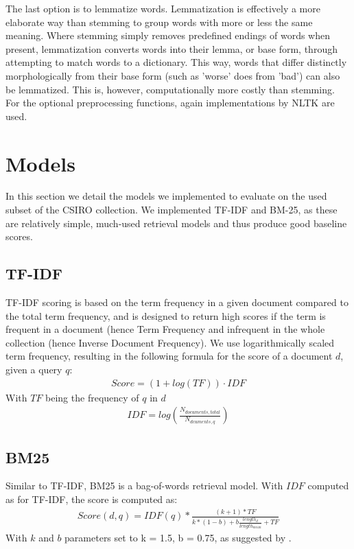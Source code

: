 \documentclass{article}
\begin{document}
The last option is to lemmatize words. Lemmatization is effectively a more elaborate way than stemming to group words with more or less the same meaning. Where stemming simply removes predefined endings of words when present, lemmatization converts words into their lemma, or base form, through attempting to match words to a dictionary. This way, words that differ distinctly morphologically from their base form (such as 'worse' does from 'bad') can also be lemmatized. This is, however, computationally more costly than stemming. For the optional preprocessing functions, again implementations by NLTK are used.

\section*{Models}
In this section we detail the models we implemented to evaluate on the used subset of the CSIRO collection. We implemented TF-IDF and BM-25, as these are relatively simple, much-used retrieval models and thus produce good baseline scores.
\subsection*{TF-IDF}
TF-IDF scoring is based on the term frequency in a given document compared to the total term frequency, and is designed to return high scores if the term is frequent in a document (hence Term Frequency and infrequent in the whole collection (hence Inverse Document Frequency). We use logarithmically scaled term frequency, resulting in the following formula for the score of a document $d$, given a query $q$:
\begin{align*}
Score = (1+log(TF))\cdot IDF
\end{align*}
With $TF$ being the frequency of $q$ in $d$
\begin{align*}
IDF = log(\frac{N_{documents, total}}{N_{dcuments, q}})
\end{align*}
\subsection*{BM25}
Similar to TF-IDF, BM25 is a bag-of-words retrieval model. With $IDF$ computed as for TF-IDF, the score is computed as:
\begin{align*}
Score(d,q) = IDF(q) * \frac{(k+1)*TF}{k*(1-b)+b\frac{length_d}{length_{mean}}+TF}
\end{align*}
With $k$ and $b$ parameters set to k = 1.5, b = 0.75, as suggested by \cite{robertson1995okapi}.
\end{document}
